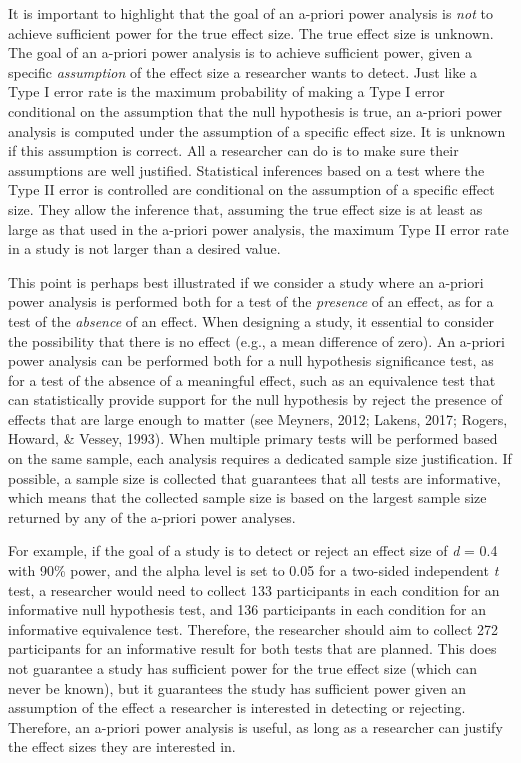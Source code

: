 \documentclass[
  english,
  ,jou, a4paper,floatsintext]{apa6}
\begin{document}
It is important to highlight that the goal of an a-priori power analysis is \emph{not} to achieve sufficient power for the true effect size. The true effect size is unknown. The goal of an a-priori power analysis is to achieve sufficient power, given a specific \emph{assumption} of the effect size a researcher wants to detect. Just like a Type I error rate is the maximum probability of making a Type I error conditional on the assumption that the null hypothesis is true, an a-priori power analysis is computed under the assumption of a specific effect size. It is unknown if this assumption is correct. All a researcher can do is to make sure their assumptions are well justified. Statistical inferences based on a test where the Type II error is controlled are conditional on the assumption of a specific effect size. They allow the inference that, assuming the true effect size is at least as large as that used in the a-priori power analysis, the maximum Type II error rate in a study is not larger than a desired value.

This point is perhaps best illustrated if we consider a study where an a-priori power analysis is performed both for a test of the \emph{presence} of an effect, as for a test of the \emph{absence} of an effect. When designing a study, it essential to consider the possibility that there is no effect (e.g., a mean difference of zero). An a-priori power analysis can be performed both for a null hypothesis significance test, as for a test of the absence of a meaningful effect, such as an equivalence test that can statistically provide support for the null hypothesis by reject the presence of effects that are large enough to matter (see Meyners, 2012; Lakens, 2017; Rogers, Howard, \& Vessey, 1993). When multiple primary tests will be performed based on the same sample, each analysis requires a dedicated sample size justification. If possible, a sample size is collected that guarantees that all tests are informative, which means that the collected sample size is based on the largest sample size returned by any of the a-priori power analyses.

For example, if the goal of a study is to detect or reject an effect size of \emph{d} = 0.4 with 90\% power, and the alpha level is set to 0.05 for a two-sided independent \emph{t} test, a researcher would need to collect 133 participants in each condition for an informative null hypothesis test, and 136 participants in each condition for an informative equivalence test. Therefore, the researcher should aim to collect 272 participants for an informative result for both tests that are planned. This does not guarantee a study has sufficient power for the true effect size (which can never be known), but it guarantees the study has sufficient power given an assumption of the effect a researcher is interested in detecting or rejecting. Therefore, an a-priori power analysis is useful, as long as a researcher can justify the effect sizes they are interested in.
\end{document}
